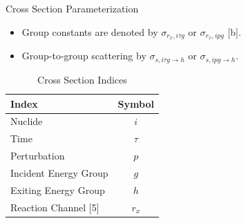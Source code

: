 \documentclass[pdf, autumn, slideColor, nocolorBG]{prosper}
\begin{document}
\begin{slide}{Cross Section Parameterization}
\begin{itemize}
    \item Group constants are denoted by $\sigma_{r_x,i\tau g}$ or $\sigma_{r_x,ipg}$ [b].
    \item Group-to-group scattering by $\sigma_{s,i\tau g\to h}$ or $\sigma_{s,ipg\to h}$.
\end{itemize}
\begin{table}[htbp]
\begin{center}
\caption{Cross Section Indices}
\label{rmg_xs_ind}
\begin{tabular}{|l|c|}
\hline
\small
\textbf{Index}        & \textbf{Symbol} \\
\hline
Nuclide               & $i$ \\
Time                  & $\tau$ \\
Perturbation          & $p$ \\
Incident Energy Group & $g$ \\
Exiting Energy Group  & $h$ \\
Reaction Channel [5] & $r_x$ \\
\hline
\end{tabular}
\end{center}
\end{table}
\end{slide}
\end{document}
